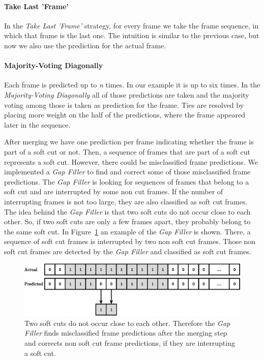 \paragraph{Take Last 'Frame'}
In the \textit{Take Last 'Frame'} strategy, for every frame we take the frame sequence, in which that frame is the last one.
The intuition is similar to the previous case, but now we also use the prediction for the actual frame.

\paragraph{Majority-Voting Diagonally}
Each frame is predicted up to \textit{n} times.
In our example it is up to six times.
In the \textit{Majority-Voting Diagonally} all of those predictions are taken and the majority voting among those is taken as prediction for the frame.
Ties are resolved by placing more weight on the half of the predictions, where the frame appeared later in the sequence.

After merging we have one prediction per frame indicating whether the frame is part of a soft cut or not.
Then, a sequence of frames that are part of a soft cut represents a soft cut.
However, there could be misclassified frame predictions.
We implemented a \textit{Gap Filler} to find and correct some of those misclassified frame predictions.
The \textit{Gap Filler} is looking for sequences of frames that belong to a soft cut and are interrupted by some non cut frames.
If the number of interrupting frames is not too large, they are also classified as soft cut frames.
The idea behind the \textit{Gap Filler} is that two soft cuts do not occur close to each other.
So, if two soft cuts are only a few frames apart, they probably belong to the same soft cut.
In Figure~\ref{fig:gap_filler} an example of the \textit{Gap Filler} is shown.
There, a sequence of soft cut frames is interrupted by two non soft cut frames.
Those non soft cut frames are detected by the \textit{Gap Filler} and classified as soft cut frames.
\begin{figure}[!htb]
	\centering
	\includegraphics[scale=.7]{images/gap_filler.eps}
	\caption{Two soft cuts do not occur close to each other. Therefore the \textit{Gap Filler} finds misclassified frame predictions after the merging step and corrects non soft cut frame predictions, if they are interrupting a soft cut.}
	\label{fig:gap_filler}
\end{figure}


